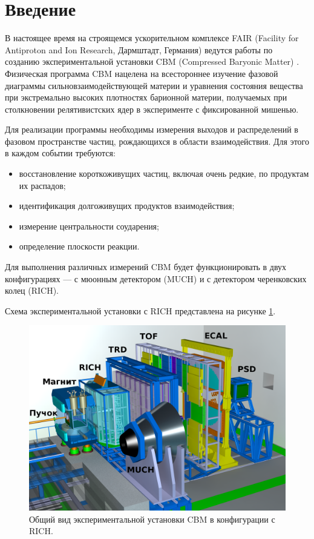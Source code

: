 \section*{Введение}\label{section:secIntro}

В настоящее время на строящемся ускорительном комплексе FAIR (Facility for Antiproton and Ion Research, Дармштадт, Германия) \cite{FAIR} ведутся работы по созданию экспериментальной установки CBM (Compressed Baryonic Matter) \cite{CBMBook, CBMSIS100, CBM_TSR, ProgressReport2014}. Физическая программа CBM нацелена на всестороннее изучение фазовой диаграммы сильновзаимодействующей материи и уравнения состояния вещества при экстремально высоких плотностях барионной материи, получаемых при столкновении релятивистских ядер в эксперименте с фиксированной мишенью.

Для реализации программы необходимы измерения выходов и распределений в фазовом пространстве частиц, рождающихся в области взаимодействия. Для этого в каждом событии требуются:
\begin{itemize}
\item {восстановление короткоживущих частиц, включая очень редкие, по продуктам их распадов;}
\item {идентификация долгоживущих продуктов взаимодействия;}
\item {измерение центральности соударения;}
\item {определение плоскости реакции.}
\end{itemize}

Для выполнения различных измерений CBM будет функционировать в двух конфигурациях --- с мюонным детектором (MUCH) и с детектором черенковских колец (RICH).

Схема экспериментальной установки с RICH представлена на рисунке \ref{fig:CBM}.

\begin{figure}
\includegraphics[width=1.0\textwidth]{pictures/1_CBM_SIS100_with_names.png}
\caption{Общий вид экспериментальной установки CBM в конфигурации с RICH.}
\label{fig:CBM}
\end{figure}

